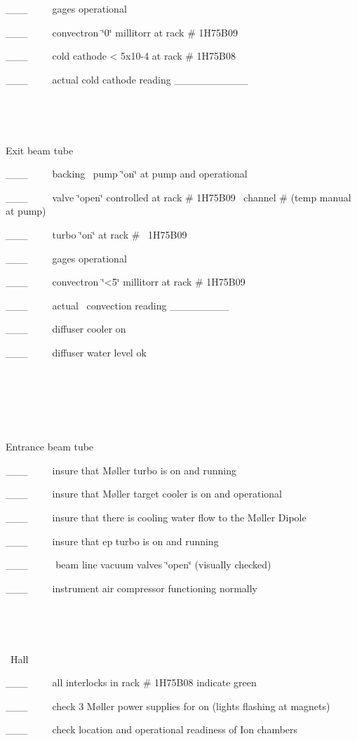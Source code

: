 \_\_\_~~~~~gages operational

\_\_\_~~~~~convectron \char`\"{}0\char`\"{} millitorr at rack \# 1H75B09

\_\_\_~~~~~cold cathode < 5x10-4 at rack \# 1H75B08

\_\_\_~~~~~actual cold cathode reading \_\_\_\_\_\_\_\_\_\_

~

~

Exit beam tube

\_\_\_~~~~~backing~ pump \char`\"{}on\char`\"{} at pump and operational

\_\_\_~~~~~valve \char`\"{}open\char`\"{} controlled at rack \# 1H75B09~ channel
\# (temp manual at pump)

\_\_\_~~~~~turbo \char`\"{}on\char`\"{} at rack \#~ 1H75B09~~~~~~~~~~~ 

\_\_\_~~~~~gages operational

\_\_\_~~~~~convectron \char`\"{}<5\char`\"{} millitorr at rack \# 1H75B09

\_\_\_~~~~~actual~ convection reading \_\_\_\_\_\_\_\_

\_\_\_~~~~~diffuser cooler on

\_\_\_~~~~~diffuser water level ok

~

~


~

Entrance beam tube

\_\_\_~~~~~insure that M{\o}ller turbo is on and running

\_\_\_~~~~~insure that M{\o}ller target cooler is on and operational

\_\_\_~~~~~insure that there is cooling water flow to the M{\o}ller Dipole 

\_\_\_~~~~~insure that ep turbo is on and running

\_\_\_~~~~~ beam line vacuum valves \char`\"{}open\char`\"{} (visually checked)

\_\_\_~~~~~instrument air compressor functioning normally

~

~

~Hall 

\_\_\_~~~~~all interlocks in rack \# 1H75B08 indicate green

\_\_\_~~~~~check 3 M{\o}ller power supplies for on (lights flashing at magnets)

\_\_\_~~~~~check location and operational readiness of Ion chambers

